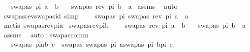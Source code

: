 \begin{isabellebody}
\ \ \ {\isachardoublequoteopen}swapas\ pi\ a\ {\isacharequal}{\kern0pt}\ b{\isachardoublequoteclose}\isanewline
\ \ \ {\isachardoublequoteopen}swapas\ {\isacharparenleft}{\kern0pt}rev\ pi{\isacharparenright}{\kern0pt}\ b\ {\isacharequal}{\kern0pt}\ a{\isachardoublequoteclose}\isanewline
%
\isadelimproof
%
\endisadelimproof
%
\isatagproof
{}\isamarkupfalse%
\ assms\ \isamarkupfalse%
\ auto%
\endisatagproof
{\isafoldproof}%
%
\isadelimproof
\isanewline
%
\endisadelimproof
\isanewline
{}\isamarkupfalse%
\ swapas{\isacharunderscore}{\kern0pt}rev{\isacharunderscore}{\kern0pt}swapas{\isacharunderscore}{\kern0pt}id\ {\isacharbrackleft}{\kern0pt}simp{\isacharbrackright}{\kern0pt}{\isacharcolon}{\kern0pt}\ \isanewline
\ \ \ {\isachardoublequoteopen}swapas\ pi\ {\isacharparenleft}{\kern0pt}swapas\ {\isacharparenleft}{\kern0pt}rev\ pi{\isacharparenright}{\kern0pt}\ a{\isacharparenright}{\kern0pt}\ {\isacharequal}{\kern0pt}\ a{\isachardoublequoteclose}\isanewline
%
\isadelimproof
\ \ %
\endisadelimproof
%
\isatagproof
{}\isamarkupfalse%
\ {\isacharparenleft}{\kern0pt}metis\ swapas{\isacharunderscore}{\kern0pt}rev{\isacharunderscore}{\kern0pt}pi{\isacharunderscore}{\kern0pt}a{\isacharparenright}{\kern0pt}%
\endisatagproof
{\isafoldproof}%
%
\isadelimproof
\isanewline
%
\endisadelimproof
\isanewline
{}\isamarkupfalse%
\ swapas{\isacharunderscore}{\kern0pt}rev{\isacharunderscore}{\kern0pt}pi{\isacharunderscore}{\kern0pt}b{\isacharcolon}{\kern0pt}\ \isanewline
\ \ \ {\isachardoublequoteopen}swapas\ {\isacharparenleft}{\kern0pt}rev\ pi{\isacharparenright}{\kern0pt}\ a\ {\isacharequal}{\kern0pt}\ b{\isachardoublequoteclose}\isanewline
\ \ \ {\isachardoublequoteopen}swapas\ pi\ b\ {\isacharequal}{\kern0pt}\ a{\isachardoublequoteclose}\isanewline
%
\isadelimproof
%
\endisadelimproof
%
\isatagproof
{}\isamarkupfalse%
\ assms\ \isamarkupfalse%
\ auto%
\endisatagproof
{\isafoldproof}%
%
\isadelimproof
\isanewline
%
\endisadelimproof
\isanewline
{}\isamarkupfalse%
\ swapas{\isacharunderscore}{\kern0pt}comm{\isacharcolon}{\kern0pt}\ \isanewline
\ \ \ {\isachardoublequoteopen}{\isacharparenleft}{\kern0pt}swapas\ {\isacharparenleft}{\kern0pt}pi{\isacharat}{\kern0pt}{\isacharbrackleft}{\kern0pt}{\isacharparenleft}{\kern0pt}a{\isacharcomma}{\kern0pt}b{\isacharparenright}{\kern0pt}{\isacharbrackright}{\kern0pt}{\isacharparenright}{\kern0pt}\ c{\isacharparenright}{\kern0pt}\ {\isacharequal}{\kern0pt}\ {\isacharparenleft}{\kern0pt}swapas\ {\isacharparenleft}{\kern0pt}{\isacharbrackleft}{\kern0pt}{\isacharparenleft}{\kern0pt}swapas\ pi\ a{\isacharcomma}{\kern0pt}swapas\ pi\ b{\isacharparenright}{\kern0pt}{\isacharbrackright}{\kern0pt}{\isacharat}{\kern0pt}pi{\isacharparenright}{\kern0pt}\ c{\isacharparenright}{\kern0pt}{\isachardoublequoteclose}\isanewline

\end{isabellebody}
